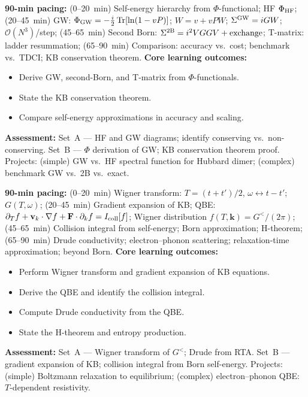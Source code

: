 \documentclass[11pt,a4paper]{article}
\begin{document}
\medskip

\begin{tcolorbox}[modulebox, title={Module~II.5 / L06: Self-Energies and Conserving Approximations}]
\textbf{90-min pacing:} (0--20~min) Self-energy hierarchy from $\Phi$-functional; HF $\Phi_{\rm HF}$; (20--45~min) GW: $\Phi_{\rm GW}=-\tfrac{i}{2}\operatorname{Tr}[\ln(1-vP)]$; $W=v+vPW$; $\Sigma^{\rm GW}=iGW$; $\mathcal{O}(N^3)$/step; (45--65~min) Second Born: $\Sigma^{\rm 2B}=i^2VGGV+\text{exchange}$; T-matrix: ladder resummation; (65--90~min) Comparison: accuracy vs.\ cost; benchmark vs.\ TDCI; KB conservation theorem.
\medskip\textbf{Core learning outcomes:}
\begin{itemize}[leftmargin=1.4em,topsep=2pt,itemsep=1pt]
  \item Derive GW, second-Born, and T-matrix from $\Phi$-functionals.
  \item State the KB conservation theorem.
  \item Compare self-energy approximations in accuracy and scaling.
\end{itemize}
\medskip\textbf{Assessment:}
Set~A --- HF and GW diagrams; identify conserving vs.\ non-conserving.
Set~B --- $\Phi$ derivation of GW; KB conservation theorem proof.
Projects: (simple) GW vs.\ HF spectral function for Hubbard dimer; (complex) benchmark GW vs.\ 2B vs.\ exact.
\end{tcolorbox}

\medskip

\begin{tcolorbox}[modulebox, title={Module~II.5 / L07: Quantum Boltzmann Equation}]
\textbf{90-min pacing:} (0--20~min) Wigner transform: $T=(t+t')/2$, $\omega\leftrightarrow t-t'$; $G(T,\omega)$; (20--45~min) Gradient expansion of KB; QBE: $\partial_T f+\mathbf{v}_k\cdot\nabla f+\mathbf{F}\cdot\partial_k f=I_{\rm coll}[f]$; Wigner distribution $f(T,\mathbf{k})=G^</(2\pi)$; (45--65~min) Collision integral from self-energy; Born approximation; H-theorem; (65--90~min) Drude conductivity; electron--phonon scattering; relaxation-time approximation; beyond Born.
\medskip\textbf{Core learning outcomes:}
\begin{itemize}[leftmargin=1.4em,topsep=2pt,itemsep=1pt]
  \item Perform Wigner transform and gradient expansion of KB equations.
  \item Derive the QBE and identify the collision integral.
  \item Compute Drude conductivity from the QBE.
  \item State the H-theorem and entropy production.
\end{itemize}
\medskip\textbf{Assessment:}
Set~A --- Wigner transform of $G^<$; Drude from RTA.
Set~B --- gradient expansion of KB; collision integral from Born self-energy.
Projects: (simple) Boltzmann relaxation to equilibrium; (complex) electron--phonon QBE: $T$-dependent resistivity.
\end{tcolorbox}
\end{document}
